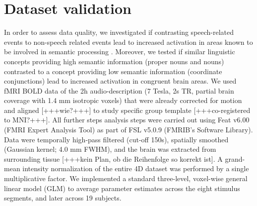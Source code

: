 \documentclass[10pt,a4paper,onecolumn]{article}
\begin{document}
\section*{Dataset validation}
In order to assess data quality, we investigated if contrasting speech-related events to non-speech related events lead to increased activation in areas known to be involved in semantic processing \citep{binder2009semantic, dewitt2012phoneme}.
Moreover, we tested if similar linguistic concepts providing high semantic information (proper nouns and nouns) contrasted to a concept providing low semantic information (coordinate conjunctions) lead to increased activation in congruent brain areas.
We used fMRI BOLD data of the 2h audio-description (7 Tesla, 2s TR, partial brain coverage with 1.4 mm isotropic voxels) \citep{hanke2014audiomovie} that were already corrected for motion and aligned [+++wie?+++] to study specific group template [+++co-registered to MNI?+++].
All further steps analysis steps were carried out using Feat v6.00 (FMRI Expert Analysis Tool)\citep{woolrich2001autocorr} as part of FSL v5.0.9 (FMRIB’s Software Library)\citep{smith2004fsl}.
Data were temporally high-pass filtered (cut-off 150s), spatially smoothed (Gaussian kernel; 4.0 mm FWHM), and the brain was extracted from surrounding tissue [+++kein Plan, ob die Reihenfolge so korrekt ist].
A grand-mean intensity normalization of the entire 4D dataset was performed by a single multiplicative factor.
We implemented a standard three-level, voxel-wise general linear model (GLM) to average parameter estimates across the eight stimulus segments, and later across 19 subjects.

\end{document}
